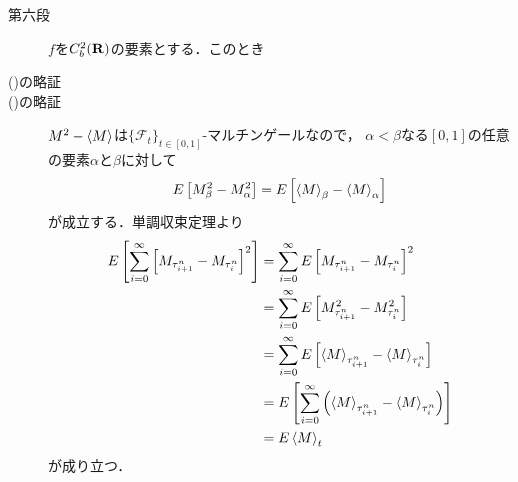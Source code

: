 \begin{sketch}
\begin{description}
			\item[第六段]
				$f$を$C^{2}_{b}(\mathbf{R})$の要素とする．このとき
				
			\item[()の略証]
				
				
			\item[()の略証]
				$M^{2} - \inprod<M>$は$\{\mathscr{F}_{t}\}_{t \in [0,1]}$-マルチンゲールなので，
				$\alpha < \beta$なる$[0,1]$の任意の要素$\alpha$と$\beta$に対して
				\begin{align}
					E\left[M_{\beta}^{2} - M_{\alpha}^{2}\right]
					= E\left[\inprod<M>_{\beta} - \inprod<M>_{\alpha}\right]
				\end{align}
				が成立する．単調収束定理より
				\begin{align}
					E\left[\sum_{i=0}^{\infty} \left[M_{\tau^{n}_{i+1}} - M_{\tau^{n}_{i}}\right]^{2}\right]
					&= \sum_{i=0}^{\infty} E\left[M_{\tau^{n}_{i+1}} - M_{\tau^{n}_{i}}\right]^{2} \\
					&= \sum_{i=0}^{\infty} E\left[M_{\tau^{n}_{i+1}}^{2} - M_{\tau^{n}_{i}}^{2}\right] \\
					&= \sum_{i=0}^{\infty} E\left[\inprod<M>_{\tau^{n}_{i+1}} - \inprod<M>_{\tau^{n}_{i}}\right] \\
					&= E\left[\sum_{i=0}^{\infty} \left(\inprod<M>_{\tau^{n}_{i+1}} - \inprod<M>_{\tau^{n}_{i}}\right) \right] \\
					&= E\inprod<M>_{t}
				\end{align}
				が成り立つ．
				

\end{description}
\end{sketch}
